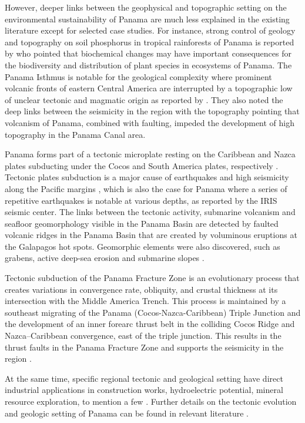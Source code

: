 \documentclass[10pt,twoside,twocolumn,a4paper]{article}
\begin{document}
However, deeper links between the geophysical and topographic setting on the environmental sustainability of Panama are much less explained in the existing literature except for selected case studies. For instance, strong control of geology and topography on soil phosphorus in tropical rainforests of Panama is reported by \cite{Dieter} who pointed that biochemical changes may have important consequences for the biodiversity and distribution of plant species in ecosystems of Panama.  
The Panama Isthmus is notable for the geological complexity where prominent volcanic fronts of eastern Central America are interrupted by a topographic low of unclear tectonic and magmatic origin as reported by \cite{Buchs}. They also noted the deep links between the seismicity in the region with the topography pointing that volcanism of Panama, combined with faulting, impeded the development of high topography in the Panama Canal area.

Panama forms part of a tectonic microplate resting on the Caribbean and Nazca plates subducting under the Cocos and South America plates, respectively \cite{Demets,Bergoeing}. Tectonic plates subduction is a major cause of earthquakes and high seismicity along the Pacific margins \cite{Lemenkova202032,Lemenkova2019107}, which is also the case for Panama where a series of repetitive earthquakes is notable at various depths, as reported by the IRIS seismic center. 
The links between the tectonic activity, submarine volcanism and seafloor geomorphology visible in the Panama Basin are detected by faulted volcanic ridges in the Panama Basin that are created by voluminous eruptions at the Galapagos hot spots. Geomorphic elements were also discovered, such as grabens,  active deep-sea erosion and submarine slopes \cite{Lonsdale}. 

Tectonic subduction of the Panama Fracture Zone is an evolutionary process that creates variations in convergence rate, obliquity, and crustal thickness at its intersection with the Middle America Trench. This process is maintained by a southeast migrating of the Panama (Cocos-Nazca-Caribbean) Triple Junction and the development of an inner forearc thrust belt in the colliding Cocos Ridge and Nazca–Caribbean convergence, east of the triple junction. This results in the thrust faults in the Panama Fracture Zone and supports the seismicity in the region \cite{Morell}.

At the same time, specific regional tectonic and geological setting have direct industrial applications in construction works, hydroelectric potential, mineral resource exploration, to mention a few \cite{Palacio,Corral}. Further details on the tectonic evolution and geologic setting of Panama can be found in relevant literature \cite{Wolters,Vergara,Cardona,Fuchs,Hardy}. 
\end{document}
